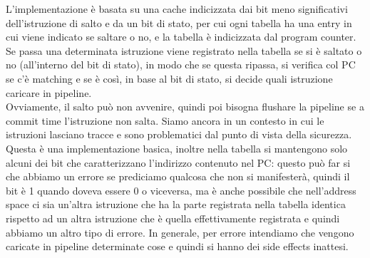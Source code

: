 \documentclass[12pt, oneside]{extbook}
\begin{document}
L'implementazione è basata su una cache indicizzata dai bit meno significativi dell'istruzione di salto e da un bit di stato, per cui ogni tabella ha una entry in cui viene indicato se saltare o no, e la tabella è indicizzata dal program counter. \\ Se passa una determinata istruzione viene registrato nella tabella se si è saltato o no (all'interno del bit di stato), in modo che se questa ripassa, si verifica col PC se c'è matching e se è così, in base al bit di stato, si decide quali istruzione caricare in pipeline.\\ Ovviamente, il salto può non avvenire, quindi poi bisogna flushare la pipeline se a commit time l'istruzione non salta. Siamo ancora in un contesto in cui le istruzioni lasciano tracce e sono problematici dal punto di vista della sicurezza.\\ Questa è una implementazione basica, inoltre nella tabella si mantengono solo alcuni dei bit che caratterizzano l'indirizzo contenuto nel PC: questo può far si che abbiamo un errore se prediciamo qualcosa che non si manifesterà, quindi il bit è 1 quando doveva essere 0 o viceversa, ma è anche possibile che nell'address space ci sia un'altra istruzione che ha la parte registrata nella tabella identica rispetto ad un altra istruzione che è quella effettivamente registrata e quindi abbiamo un altro tipo di errore. In generale, per errore intendiamo che vengono caricate in pipeline determinate cose e quindi si hanno dei side effects inattesi.
\end{document}
